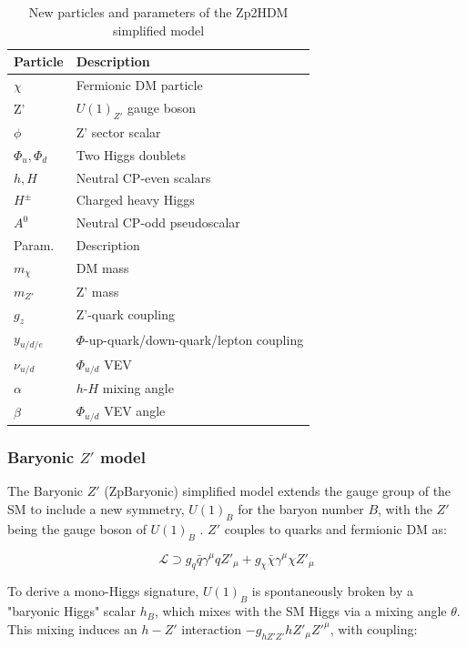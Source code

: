 \begin{table}[htbH]
\begin{center}
\begin{tabular}{ l | l}
\hline
Particle & Description \\
\hline
$\chi$ & Fermionic DM particle \\
Z' & $U(1)_{Z'}$ gauge boson \\
$\phi$ & Z' sector scalar \\
$\Phi_u, \Phi_d$ & Two Higgs doublets \\
$h, H$ & Neutral CP-even scalars \\
$H^\pm$ & Charged heavy Higgs \\
$A^0$ & Neutral CP-odd pseudoscalar \\
\hline
Param. & Description \\
\hline
$m_\chi$ & DM mass \\
$m_{Z'}$ & Z' mass \\
$g_z$ & Z'-quark coupling \\
$y_{u/d/e}$ & $\Phi$-up-quark/down-quark/lepton coupling \\
$\nu_{u/d}$ & $\Phi_{u/d}$ VEV \\
$\alpha$ & $h$-$H$ mixing angle \\
$\beta$ & $\Phi_{u/d}$ VEV angle \\
\hline
\end{tabular}
\caption{New particles and parameters of the Zp2HDM simplified model \cite{Carpenter:2013xra}}\label{tab:Zp2HDM}
\end{center}
\end{table}


\subsubsection{Baryonic $Z'$ model}

The Baryonic $Z'$ (ZpBaryonic) simplified model extends the gauge group of the SM to include a new symmetry, $U(1)_B$ for the baryon number $B$, with the $Z'$ being the gauge boson of $U(1)_B$ \cite{Carone:1994aa, Agashe:2004bm, FileviezPerez:2010gw}. $Z'$ couples to quarks and fermionic DM as:

\begin{equation}
\mathcal{L} \supset g_q \bar{q} \gamma^\mu q Z'_\mu + g_\chi \bar{\chi} \gamma^\mu \chi Z'_\mu
\end{equation}

To derive a mono-Higgs signature, $U(1)_B$ is spontaneously broken by a "baryonic Higgs" scalar $h_B$, which mixes with the SM Higgs via a mixing angle $\theta$. This mixing induces an $h-Z'$ interaction $-g_{hZ'Z'} h Z'_\mu Z'^\mu$, with coupling:

